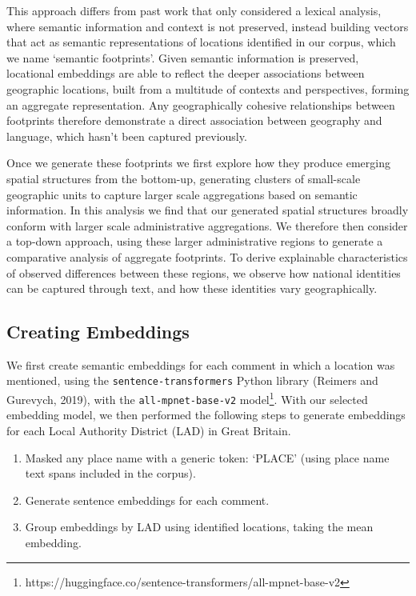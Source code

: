\documentclass[
]{article}
\providecommand{\tightlist}{%
  \setlength{\itemsep}{0pt}\setlength{\parskip}{0pt}}\usepackage{longtable,booktabs,array}
\begin{document}
This approach differs from past work that only considered a lexical
analysis, where semantic information and context is not preserved,
instead building vectors that act as semantic representations of
locations identified in our corpus, which we name `semantic footprints'.
Given semantic information is preserved, locational embeddings are able
to reflect the deeper associations between geographic locations, built
from a multitude of contexts and perspectives, forming an aggregate
representation. Any geographically cohesive relationships between
footprints therefore demonstrate a direct association between geography
and language, which hasn't been captured previously.

Once we generate these footprints we first explore how they produce
emerging spatial structures from the bottom-up, generating clusters of
small-scale geographic units to capture larger scale aggregations based
on semantic information. In this analysis we find that our generated
spatial structures broadly conform with larger scale administrative
aggregations. We therefore then consider a top-down approach, using
these larger administrative regions to generate a comparative analysis
of aggregate footprints. To derive explainable characteristics of
observed differences between these regions, we observe how national
identities can be captured through text, and how these identities vary
geographically.

\subsection{Creating Embeddings}\label{creating-embeddings}

We first create semantic embeddings for each comment in which a location
was mentioned, using the \texttt{sentence-transformers} Python library
(Reimers and Gurevych, 2019), with the \texttt{all-mpnet-base-v2}
model\footnote{https://huggingface.co/sentence-transformers/all-mpnet-base-v2}.
With our selected embedding model, we then performed the following steps
to generate embeddings for each Local Authority District (LAD) in Great
Britain.

\begin{enumerate}
\def\labelenumi{\arabic{enumi}.}
\tightlist
\item
  Masked any place name with a generic token: `PLACE' (using place name
  text spans included in the corpus).
\item
  Generate sentence embeddings for each comment.
\item
  Group embeddings by LAD using identified locations, taking the mean
  embedding.
\end{enumerate}
\end{document}
